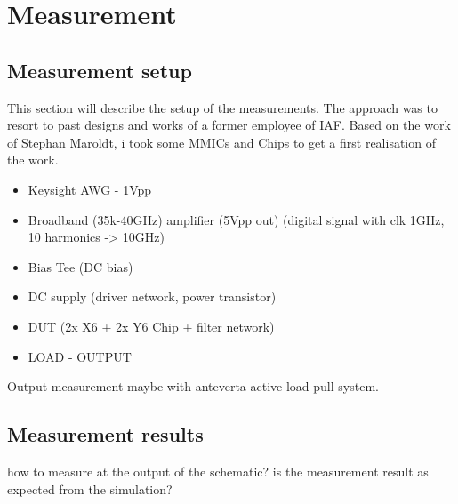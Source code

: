 \chapter{Measurement}
\section{Measurement setup}
This section will describe the setup of the measurements. The approach was to resort to past designs and works of a former employee of IAF. Based on the work of Stephan Maroldt, i took some MMICs and Chips to get a first realisation of the work.
\begin{itemize}
	\item Keysight AWG - 1Vpp
	\item Broadband (35k-40GHz) amplifier (5Vpp out) (digital signal with clk 1GHz, 10 harmonics -> 10GHz)
	\item Bias Tee (DC bias)
	\item DC supply (driver network, power transistor)
	\item DUT (2x X6 + 2x Y6 Chip + filter network)
	\item LOAD - OUTPUT
\end{itemize}
Output measurement maybe with anteverta active load pull system. 
\section{Measurement results}
how to measure at the output of the schematic? is the measurement result as expected from the simulation?